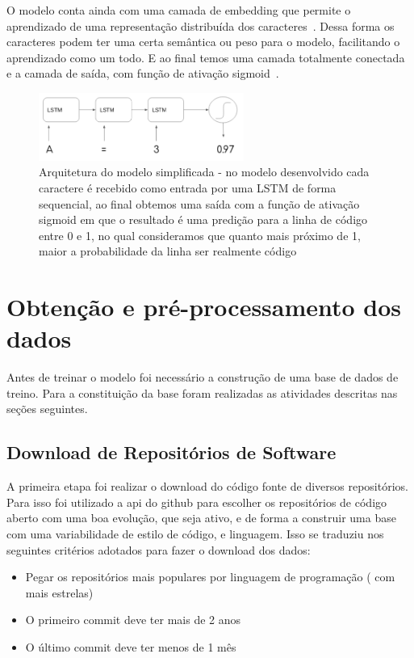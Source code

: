\documentclass[12pt]{article}
\begin{document}
O modelo conta ainda com uma camada de embedding que permite o aprendizado de uma representação
distribuída dos caracteres~\cite{mikolov2013distributed}. Dessa forma os caracteres podem ter uma
certa semântica ou peso para o modelo, facilitando o aprendizado como um todo. E ao final temos
uma camada totalmente conectada e a camada de saída, com função de ativação sigmoid~\cite{zurada1992introduction}.

\begin{figure}[ht]
  \centering
  \includegraphics[width=0.6\textwidth]{../images/simple-model.png}
  \caption{ Arquitetura do modelo simplificada - no modelo desenvolvido cada 
  caractere é recebido como entrada por uma LSTM de forma sequencial, ao final
  obtemos uma saída com a função de ativação sigmoid em que o resultado é uma 
  predição para a linha de código entre 0 e 1, no qual consideramos que quanto
  mais próximo de 1, maior a probabilidade da linha ser realmente código}
  \label{fig:simple-model}
\end{figure}

\section{Obtenção e pré-processamento dos dados} \label{sec:dev}

Antes de treinar o modelo foi necessário a construção de uma base de dados de
treino. Para a constituição da base foram realizadas as atividades descritas 
nas seções seguintes.

\subsection{Download de Repositórios de Software}
A primeira etapa foi realizar o download do código fonte de diversos repositórios.
Para isso foi utilizado a api do github para escolher os repositórios de
código aberto com uma boa evolução, que seja ativo, e de forma a construir uma base
com uma variabilidade de estilo de código, e linguagem. 
Isso se traduziu nos seguintes critérios adotados para fazer o download dos dados:
\begin{itemize}
  \item Pegar os repositórios mais populares por linguagem de  programação ( com mais estrelas)
  \item O primeiro commit deve ter mais de 2 anos
  \item O último commit deve ter menos de 1 mês
\end{itemize} 
\end{document}

